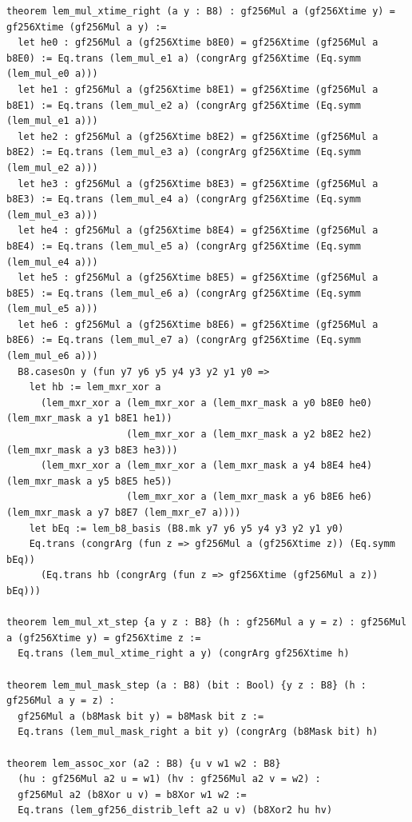\documentclass[10pt,twocolumn]{article}
\theoremstyle{spectralthm}
\begin{document}
\begin{lstlisting}[language=Lean4,caption={Standalone Pure Init.Prelude Term-Mode Lean 4 Expansion (thm30--thm37, v1.1.0, 0 sorry, 0 axioms).},label={lst:lean_v110}]
theorem lem_mul_xtime_right (a y : B8) : gf256Mul a (gf256Xtime y) = gf256Xtime (gf256Mul a y) :=
  let he0 : gf256Mul a (gf256Xtime b8E0) = gf256Xtime (gf256Mul a b8E0) := Eq.trans (lem_mul_e1 a) (congrArg gf256Xtime (Eq.symm (lem_mul_e0 a)))
  let he1 : gf256Mul a (gf256Xtime b8E1) = gf256Xtime (gf256Mul a b8E1) := Eq.trans (lem_mul_e2 a) (congrArg gf256Xtime (Eq.symm (lem_mul_e1 a)))
  let he2 : gf256Mul a (gf256Xtime b8E2) = gf256Xtime (gf256Mul a b8E2) := Eq.trans (lem_mul_e3 a) (congrArg gf256Xtime (Eq.symm (lem_mul_e2 a)))
  let he3 : gf256Mul a (gf256Xtime b8E3) = gf256Xtime (gf256Mul a b8E3) := Eq.trans (lem_mul_e4 a) (congrArg gf256Xtime (Eq.symm (lem_mul_e3 a)))
  let he4 : gf256Mul a (gf256Xtime b8E4) = gf256Xtime (gf256Mul a b8E4) := Eq.trans (lem_mul_e5 a) (congrArg gf256Xtime (Eq.symm (lem_mul_e4 a)))
  let he5 : gf256Mul a (gf256Xtime b8E5) = gf256Xtime (gf256Mul a b8E5) := Eq.trans (lem_mul_e6 a) (congrArg gf256Xtime (Eq.symm (lem_mul_e5 a)))
  let he6 : gf256Mul a (gf256Xtime b8E6) = gf256Xtime (gf256Mul a b8E6) := Eq.trans (lem_mul_e7 a) (congrArg gf256Xtime (Eq.symm (lem_mul_e6 a)))
  B8.casesOn y (fun y7 y6 y5 y4 y3 y2 y1 y0 =>
    let hb := lem_mxr_xor a
      (lem_mxr_xor a (lem_mxr_xor a (lem_mxr_mask a y0 b8E0 he0) (lem_mxr_mask a y1 b8E1 he1))
                     (lem_mxr_xor a (lem_mxr_mask a y2 b8E2 he2) (lem_mxr_mask a y3 b8E3 he3)))
      (lem_mxr_xor a (lem_mxr_xor a (lem_mxr_mask a y4 b8E4 he4) (lem_mxr_mask a y5 b8E5 he5))
                     (lem_mxr_xor a (lem_mxr_mask a y6 b8E6 he6) (lem_mxr_mask a y7 b8E7 (lem_mxr_e7 a))))
    let bEq := lem_b8_basis (B8.mk y7 y6 y5 y4 y3 y2 y1 y0)
    Eq.trans (congrArg (fun z => gf256Mul a (gf256Xtime z)) (Eq.symm bEq))
      (Eq.trans hb (congrArg (fun z => gf256Xtime (gf256Mul a z)) bEq)))

theorem lem_mul_xt_step {a y z : B8} (h : gf256Mul a y = z) : gf256Mul a (gf256Xtime y) = gf256Xtime z :=
  Eq.trans (lem_mul_xtime_right a y) (congrArg gf256Xtime h)

theorem lem_mul_mask_step (a : B8) (bit : Bool) {y z : B8} (h : gf256Mul a y = z) :
  gf256Mul a (b8Mask bit y) = b8Mask bit z :=
  Eq.trans (lem_mul_mask_right a bit y) (congrArg (b8Mask bit) h)

theorem lem_assoc_xor (a2 : B8) {u v w1 w2 : B8}
  (hu : gf256Mul a2 u = w1) (hv : gf256Mul a2 v = w2) :
  gf256Mul a2 (b8Xor u v) = b8Xor w1 w2 :=
  Eq.trans (lem_gf256_distrib_left a2 u v) (b8Xor2 hu hv)


\end{lstlisting}
\end{document}
